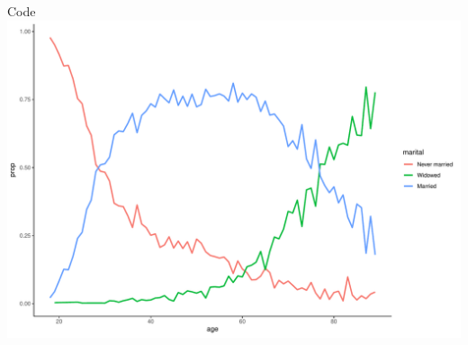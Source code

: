 \documentclass[
  ignorenonframetext,
]{beamer}
\begin{document}
\begin{frame}[fragile]{Code}
\includegraphics{gss_cat_files/figure-beamer/unnamed-chunk-1-104.pdf}
\end{frame}
\end{document}
